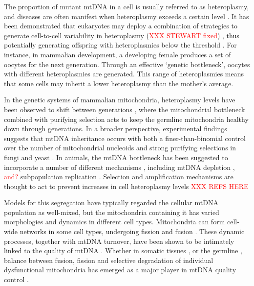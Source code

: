 \documentclass{article}
\begin{document}
The proportion of mutant mtDNA in a cell is usually referred to as heteroplasmy, and diseases are often manifest when heteroplasmy exceeds a certain level \citep{rossignol2003mitochondrial}. It has been demonstrated that eukaryotes may deploy a combination of strategies to generate cell-to-cell variability in heteroplasmy (\textcolor{red}{XXX STEWART fixed}) \citep{stewart2015dynamics, radzvilavicius2017mitigating, johnston2019varied, edwards2021avoiding}, thus potentially generating offspring with heteroplasmies below the threshold \citep{burr2018mitochondrial, burgstaller2014mtdna, segui2009mitochondrial}. For instance, in mammalian development, a developing female produces a set of oocytes for the next generation. Through an effective `genetic bottleneck', oocytes with different heteroplasmies are generated. This range of heteroplasmies means that some cells may inherit a lower heteroplasmy than the mother's average.

In the genetic systems of mammalian mitochondria, heteroplasmy levels have been observed to shift between generations \citep{burgstaller2018large, wei2019germline}, where the mitochondrial bottleneck \citep{johnston2015stochastic, johnston2019varied} combined with purifying selection \citep{fan2008mouse, stewart2008strong, hill2014selective, floros2018segregation, lieber2019mitochondrial} acts to keep the germline mitochondria healthy down through generations. In a broader perspective, experimental findings suggests that mtDNA inheritance occurs with both a finer-than-binomial control over the number of mitochondrial nucleoids \citep{jajoo2016accurate} and strong purifying selections \citep{jakubke2021cristae} in fungi and yeast \citep{mendoza2020mitochondrial}. In animals, the mtDNA bottleneck has been suggested to incorporate a number of different mechanisms \cite{johnston2015stochastic}, including mtDNA depletion \citep{cree2008reduction, cao2007mitochondrial, cao2009new}, \textcolor{red}{and?} subpopulation replication \citep{cao2007mitochondrial, wai2008mitochondrial}. Selection and amplification mechanisms are thought to act to prevent increases in cell heteroplasmy levels \textcolor{red}{XXX REFS HERE \citep{stewart2015dynamics,stewart2008strong}}

Models for this segregation have typically regarded the cellular mtDNA population as well-mixed, but the mitochondria containing it has varied morphologies and dynamics in different cell types. Mitochondria can form cell-wide networks in some cell types, undergoing fission and fusion \citep{mendoza2020mitochondrial, sukhorukov2012emergence, hoitzing2015function, zamponi2018mitochondrial, carlton2020membrane}. These dynamic processes, together with mtDNA turnover, have been shown to be intimately linked to the quality of mtDNA \citep{jakubke2021cristae,pla2019reshaping, chapman2020maintenance}. Whether in somatic tissues \citep{mouli2009frequency, tam2013mathematical, patel2013optimal, tam2015context}, or the germline \citep{edwards2021avoiding, lieber2019mitochondrial}, balance between fusion, fission and selective degradation of individual dysfunctional mitochondria has emerged as a major player in mtDNA quality control \citep{mouli2009frequency,patel2013optimal,twig2008fission, twig2008mitochondrial, figge2012deceleration}. 
\end{document}
